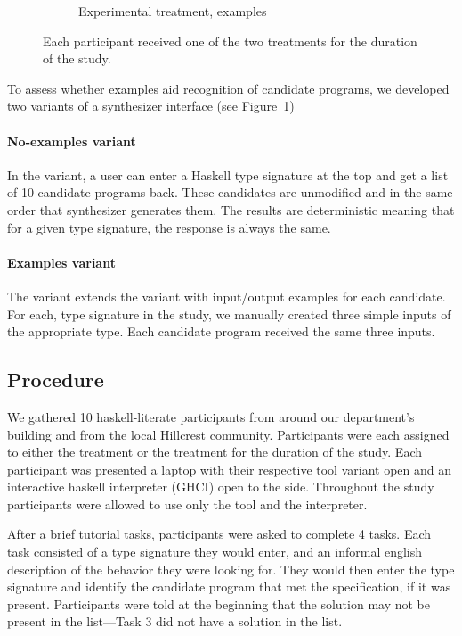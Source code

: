 \begin{figure}[t!]
\begin{subfigure}[t]{0.5\textwidth}
        \caption{Experimental treatment, examples}
    \end{subfigure}
    \caption{Each participant received one of the two treatments for the duration of the study.}
    \label{fig:ui}
\end{figure}
To assess whether examples aid recognition of candidate programs, we
developed two variants of a synthesizer interface (see Figure~\ref{fig:ui})

\paragraph{No-examples variant}
%
In the \noexamples variant, a user can enter a Haskell type signature at the top and get a
list of 10 candidate programs back.
%
These candidates are unmodified and in the same order that \hoogleplus
synthesizer generates them.
%
The results are deterministic meaning that for a given type signature, the
response is always the same.

\paragraph{Examples variant}
The \examples variant extends the \noexamples variant with input/output
examples for each candidate.
%
For each, type signature in the study, we manually created three simple
inputs of the appropriate type.
%
Each candidate program received the same three inputs.


\subsection{Procedure}
We gathered 10 haskell-literate participants from around our department's
building and from the local Hillcrest community.
%
Participants were each assigned to either the \noexamples treatment or the
\examples treatment for the duration of the study.
%
Each participant was presented a laptop with their respective tool variant open
and an interactive haskell interpreter (GHCI) open to the side.
%
Throughout the study participants were allowed to use only the tool and the
interpreter.

After a brief tutorial tasks, participants were asked to complete 4 tasks.
%
Each task consisted of a type signature they would enter, and an informal
english description of the behavior they were looking for.
%
They would then enter the type signature and identify the candidate program that
met the specification, if it was present.
%
Participants were told at the beginning that the solution may not be present
in the list---Task 3 did not have a solution in the list.

